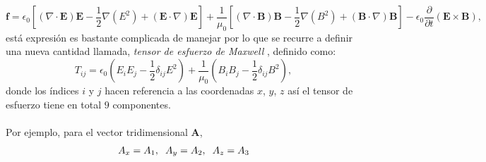 \documentclass[11pt,fleqn]{book} %
\begin{document}
\begin{equation}
\textbf{f}=\epsilon_{0}\left[(\nabla\cdot\textbf{E})\textbf{E}-\frac{1}{2}\nabla(E^{2})+(\textbf{E}\cdot\nabla)\textbf{E}\right] +\frac{1}{\mu_{0}}\left[(\nabla\cdot\textbf{B})\textbf{B}-\frac{1}{2}\nabla(B^{2})+(\textbf{B}\cdot\nabla)\textbf{B}\right]-\epsilon_{0}\frac{\partial}{\partial t}(\textbf{E}\times\textbf{B}),  \label{Dens Fuerza 2}
\end{equation}
est\'a expresi\'on es bastante complicada de manejar por lo que se recurre a definir una nueva cantidad llamada, \textit{tensor de esfuerzo de Maxwell} \cite{Griffiths1999}, definido como:
\begin{equation}
T_{ij}=\epsilon_{0}\left(E_{i}E_{j}-\frac{1}{2}\delta_{ij}E^{2}\right)+\frac{1}{\mu_{0}}\left(B_{i}B_{j}-\frac{1}{2}\delta_{ij}B^{2}\right),  \label{Tensor de Esfuerzo}
\end{equation}
donde los \'indices $i$ y $j$ hacen referencia a las coordenadas $x$, $y$, $z$  as\'i el tensor de esfuerzo tiene en total $9$ componentes.\\\\
Por ejemplo, para el vector tridimensional $\textbf{A}$,
\begin{eqnarray*}
A_x=A_1, \hspace{2mm} A_y=A_2, \hspace{2mm} A_z=A_3
\end{eqnarray*}
\end{document}
